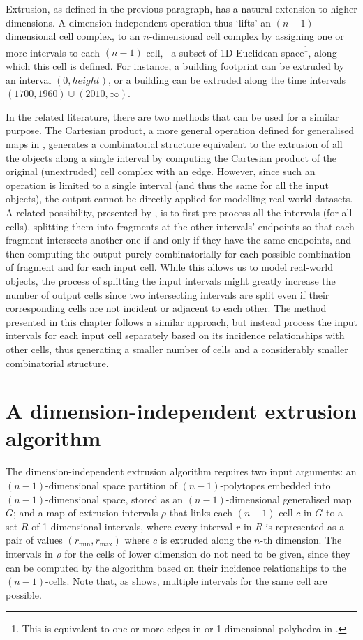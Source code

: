 Extrusion, as defined in the previous paragraph, has a natural extension to higher dimensions.
A dimension-independent operation thus `lifts' an $(n-1)$-dimensional cell complex, to an $n$-dimensional cell complex by assigning one or more intervals to each $(n-1)$-cell, \ie\ a subset of 1D Euclidean space\footnote{This is equivalent to one or more edges in \citet{Lienhardt04} or 1-dimensional polyhedra in \citet{Ferrucci93}.}, along which this cell is defined.
For instance, a building footprint can be extruded by an interval $(0, height)$, or a building can be extruded along the time intervals $(1700, 1960) \cup (2010, \infty)$.

In the related literature, there are two methods that can be used for a similar purpose.
The Cartesian product, a more general operation defined for generalised maps in \citet{Lienhardt04}, generates a combinatorial structure equivalent to the extrusion of all the objects along a single interval by computing the Cartesian product of the original (unextruded) cell complex with an edge.
However, since such an operation is limited to a single interval (and thus the same for all the input objects), the output cannot be directly applied for modelling real-world datasets.
A related possibility, presented by \citet{Ferrucci93}, is to first pre-process all the intervals (for all cells), splitting them into fragments at the other intervals' endpoints so that each fragment intersects another one if and only if they have the same endpoints, and then computing the output purely combinatorially for each possible combination of fragment and for each input cell.
While this allows us to model real-world objects, the process of splitting the input intervals might greatly increase the number of output cells since two intersecting intervals are split even if their corresponding cells are not incident or adjacent to each other.
The method presented in this chapter follows a similar approach, but instead process the input intervals for each input cell separately based on its incidence relationships with other cells, thus generating a smaller number of cells and a considerably smaller combinatorial structure.

\section{A dimension-independent extrusion algorithm}
\label{se:extrusion-algos}

The dimension-independent extrusion algorithm requires two input arguments: an $(n-1)$-dimensional space partition of $(n-1)$-polytopes embedded into $(n-1)$-dimensional space, stored as an $(n-1)$-dimensional generalised map $G$; and a map of extrusion intervals $\rho$ that links each $(n-1)$-cell $c$ in $G$ to a set $R$ of 1-dimensional intervals, where every interval $r$ in $R$ is represented as a pair of values $(r_{\min}, r_{\max})$ where $c$ is extruded along the $n$-th dimension.
The intervals in $\rho$ for the cells of lower dimension do not need to be given, since they can be computed by the algorithm based on their incidence relationships to the $(n-1)$-cells.
Note that, as  shows, multiple intervals for the same cell are possible.

